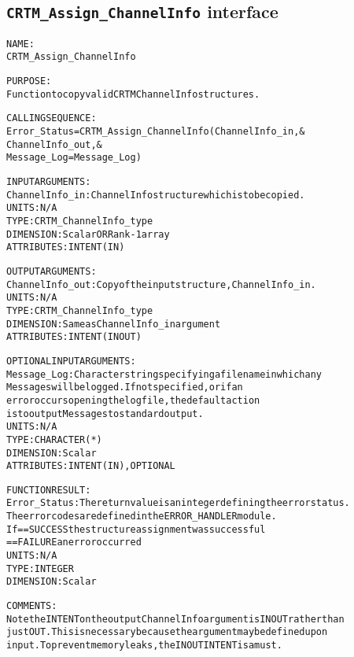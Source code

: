 \subsection{\texttt{CRTM\_Assign\_ChannelInfo} interface}
  \label{sec:CRTM_Assign_ChannelInfo_interface}
  \begin{alltt}
 
  NAME:
        CRTM_Assign_ChannelInfo
 
  PURPOSE:
        Function to copy valid CRTM ChannelInfo structures.
 
  CALLING SEQUENCE:
        Error_Status = CRTM_Assign_ChannelInfo( ChannelInfo_in         , &
                                                ChannelInfo_out        , &
                                                Message_Log=Message_Log  )
 
  INPUT ARGUMENTS:
        ChannelInfo_in:  ChannelInfo structure which is to be copied.
                         UNITS:      N/A
                         TYPE:       CRTM_ChannelInfo_type
                         DIMENSION:  Scalar OR Rank-1 array
                         ATTRIBUTES: INTENT(IN)
 
  OUTPUT ARGUMENTS:
        ChannelInfo_out: Copy of the input structure, ChannelInfo_in.
                         UNITS:      N/A
                         TYPE:       CRTM_ChannelInfo_type
                         DIMENSION:  Same as ChannelInfo_in argument
                         ATTRIBUTES: INTENT(IN OUT)
 
  OPTIONAL INPUT ARGUMENTS:
        Message_Log:     Character string specifying a filename in which any
                         Messages will be logged. If not specified, or if an
                         error occurs opening the log file, the default action
                         is to output Messages to standard output.
                         UNITS:      N/A
                         TYPE:       CHARACTER(*)
                         DIMENSION:  Scalar
                         ATTRIBUTES: INTENT(IN), OPTIONAL
 
  FUNCTION RESULT:
        Error_Status:    The return value is an integer defining the error status.
                         The error codes are defined in the ERROR_HANDLER module.
                         If == SUCCESS the structure assignment was successful
                            == FAILURE an error occurred
                         UNITS:      N/A
                         TYPE:       INTEGER
                         DIMENSION:  Scalar
 
  COMMENTS:
        Note the INTENT on the output ChannelInfo argument is IN OUT rather than
        just OUT. This is necessary because the argument may be defined upon
        input. To prevent memory leaks, the IN OUT INTENT is a must.
 
  \end{alltt}
